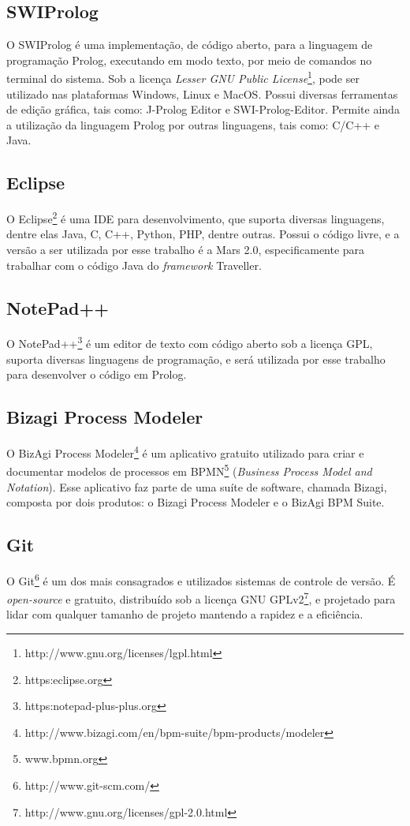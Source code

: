 \subsection{SWIProlog}
O SWIProlog é uma implementação, de código aberto, para a linguagem de programação Prolog, executando em modo texto, por meio de comandos no terminal do sistema. Sob a licença \textit{Lesser GNU Public License}\footnote{http://www.gnu.org/licenses/lgpl.html}, pode ser utilizado nas plataformas Windows, Linux e MacOS. Possui diversas ferramentas de edição gráfica, tais como: J-Prolog Editor e SWI-Prolog-Editor.
Permite ainda a utilização da linguagem Prolog por outras linguagens, tais como: C/C++ e Java.

\subsection{Eclipse}
O Eclipse\footnote{https:\/\/eclipse.org\/} é uma IDE para desenvolvimento, que suporta diversas linguagens, dentre elas Java, C, C++, Python, PHP, dentre outras. Possui o código livre, e a versão a ser utilizada por esse trabalho é a Mars 2.0, especificamente para trabalhar com o código Java do \textit{framework} Traveller. 

\subsection{NotePad++}
O NotePad++\footnote{https:\/\/notepad-plus-plus.org\/} é um editor de texto com código aberto sob a licença GPL, suporta diversas linguagens de programação, e será utilizada por esse trabalho para desenvolver o código em Prolog.	

\subsection{Bizagi Process Modeler}
O BizAgi Process Modeler\footnote{http://www.bizagi.com/en/bpm-suite/bpm-products/modeler} é um aplicativo gratuito utilizado para criar e documentar modelos de processos em BPMN\footnote{www.bpmn.org} (\textit{Business Process Model and Notation}). Esse aplicativo faz parte de uma suíte de software, chamada Bizagi, composta por dois produtos: o Bizagi Process Modeler e o BizAgi BPM Suite. 

\subsection{Git}
O Git\footnote{http://www.git-scm.com/} é um dos mais consagrados e utilizados sistemas de controle de versão. É \textit{open-source} e gratuito, distribuído sob a licença GNU GPLv2\footnote{http://www.gnu.org/licenses/gpl-2.0.html}, e projetado para lidar com qualquer tamanho de projeto mantendo a rapidez e a eficiência. 

